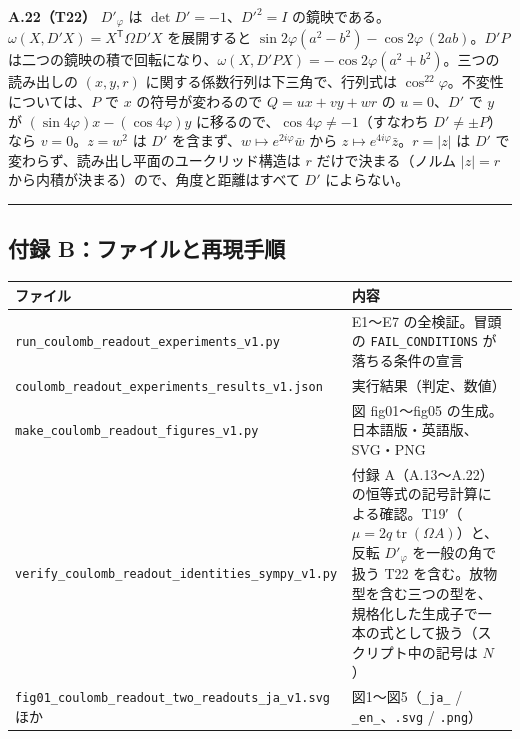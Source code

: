 \documentclass[
  a4paper,
]{ltjsarticle}
\newcounter{none} %
\begin{document}
\textbf{A.22（T22）} \(D'_\varphi\) は \(\det D'=-1\)、\(D'^2=I\)
の鏡映である。\(\omega(X,D'X)=X^{\mathsf T}\Omega D'X\) を展開すると
\(\sin2\varphi(a^2-b^2)-\cos2\varphi\,(2ab)\)。\(D'P\)
は二つの鏡映の積で回転になり、\(\omega(X,D'PX)=-\cos2\varphi(a^2+b^2)\)。三つの読み出しの
\((x,y,r)\) に関する係数行列は下三角で、行列式は
\(\cos^22\varphi\)。不変性については、\(P\) で \(x\) の符号が変わるので
\(Q=ux+vy+wr\) の \(u=0\)、\(D'\) で \(y\) が
\((\sin4\varphi)x-(\cos4\varphi)y\)
に移るので、\(\cos4\varphi\neq-1\)（すなわち \(D'\neq\pm P\)）なら
\(v=0\)。\(z=w^2\) は \(D'\) を含まず、\(w\mapsto e^{2i\varphi}\bar w\)
から \(z\mapsto e^{4i\varphi}\bar z\)。\(r=\lvert z\rvert\) は \(D'\)
で変わらず、読み出し平面のユークリッド構造は \(r\) だけで決まる（ノルム
\(\lvert z\rvert=r\) から内積が決まる）ので、角度と距離はすべて \(D'\)
によらない。

\begin{center}\rule{0.5\linewidth}{0.5pt}\end{center}

\subsection{付録
B：ファイルと再現手順}\label{ux4ed8ux9332-bux30d5ux30a1ux30a4ux30ebux3068ux518dux73feux624bux9806}

{\def\LTcaptype{none} %
\begin{longtable}[]{@{}
  >{\raggedright\arraybackslash}p{}
  >{\raggedright\arraybackslash}p{}@{}}
\toprule\noalign{}
\begin{minipage}[b]{\linewidth}\raggedright
ファイル
\end{minipage} & \begin{minipage}[b]{\linewidth}\raggedright
内容
\end{minipage} \\
\midrule\noalign{}
\endhead
\bottomrule\noalign{}
\endlastfoot
\texttt{run\_coulomb\_readout\_experiments\_v1.py} & E1〜E7
の全検証。冒頭の \texttt{FAIL\_CONDITIONS} が落ちる条件の宣言 \\
\texttt{coulomb\_readout\_experiments\_results\_v1.json} &
実行結果（判定、数値） \\
\texttt{make\_coulomb\_readout\_figures\_v1.py} & 図 fig01〜fig05
の生成。日本語版・英語版、SVG・PNG \\
\texttt{verify\_coulomb\_readout\_identities\_sympy\_v1.py} & 付録
A（A.13〜A.22）の恒等式の記号計算による確認。T19′（\(\mu=2q\operatorname{tr}(\Omega A)\)）と、反転
\(D'_\varphi\) を一般の角で扱う T22
を含む。放物型を含む三つの型を、規格化した生成子で一本の式として扱う（スクリプト中の記号は
\(N\)） \\
\texttt{fig01\_coulomb\_readout\_two\_readouts\_ja\_v1.svg} ほか &
図1〜図5（\texttt{\_ja\_} / \texttt{\_en\_}、\texttt{.svg} /
\texttt{.png}） \\
\end{longtable}
}
\end{document}
